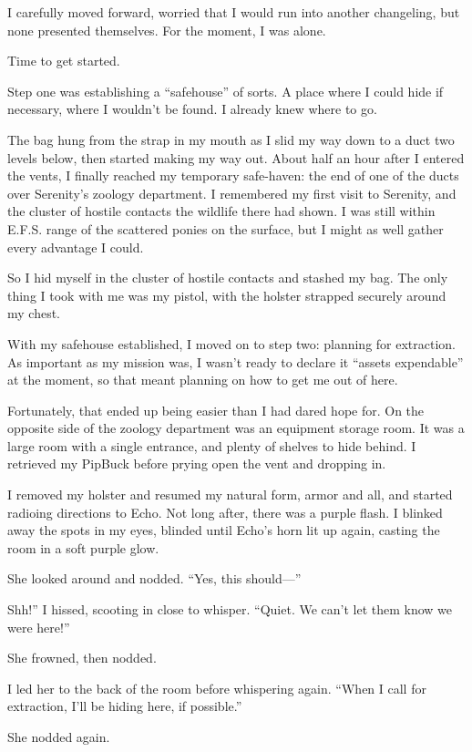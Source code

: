 I carefully moved forward, worried that I would run into another changeling, but none presented themselves. For the moment, I was alone.

Time to get started.

Step one was establishing a “safehouse” of sorts. A place where I could hide if necessary, where I wouldn’t be found. I already knew where to go.

The bag hung from the strap in my mouth as I slid my way down to a duct two levels below, then started making my way out. About half an hour after I entered the vents, I finally reached my temporary safe-haven: the end of one of the ducts over Serenity’s zoology department. I remembered my first visit to Serenity, and the cluster of hostile contacts the wildlife there had shown. I was still within E.F.S. range of the scattered ponies on the surface, but I might as well gather every advantage I could.

So I hid myself in the cluster of hostile contacts and stashed my bag. The only thing I took with me was my pistol, with the holster strapped securely around my chest.

With my safehouse established, I moved on to step two: planning for extraction. As important as my mission was, I wasn’t ready to declare it “assets expendable” at the moment, so that meant planning on how to get me out of here.

Fortunately, that ended up being easier than I had dared hope for. On the opposite side of the zoology department was an equipment storage room. It was a large room with a single entrance, and plenty of shelves to hide behind. I retrieved my PipBuck before prying open the vent and dropping in.

I removed my holster and resumed my natural form, armor and all, and started radioing directions to Echo. Not long after, there was a purple flash. I blinked away the spots in my eyes, blinded until Echo’s horn lit up again, casting the room in a soft purple glow.

She looked around and nodded. “Yes, this should—”

\leavevmode{}Shh!” I hissed, scooting in close to whisper. “Quiet. We can’t let them know we were here!”

She frowned, then nodded.

I led her to the back of the room before whispering again. “When I call for extraction, I’ll be hiding here, if possible.”

She nodded again.

